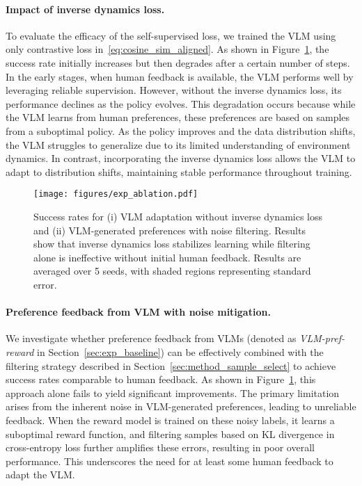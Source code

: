 \paragraph{Impact of inverse dynamics loss.}  
To evaluate the efficacy of the self-supervised loss, we trained the VLM using only contrastive loss in~\eqref{eq:cosine_sim_aligned}. 
As shown in Figure~\ref{fig:ablation}, the success rate initially increases but then degrades after a certain number of steps. 
In the early stages, when human feedback is available, the VLM performs well by leveraging reliable supervision. However, without the inverse dynamics loss, its performance declines as the policy evolves. This degradation occurs because while the VLM learns from human preferences, these preferences are based on samples from a suboptimal policy. As the policy improves and the data distribution shifts, the VLM struggles to generalize due to its limited understanding of environment dynamics. In contrast, incorporating the inverse dynamics loss allows the VLM to adapt to distribution shifts, maintaining stable performance throughout training.

\begin{figure}[t]
    \centering
    \texttt{[image: figures/exp\_ablation.pdf]}
    \caption{Success rates for (i) VLM adaptation without inverse dynamics loss and (ii) VLM-generated preferences with noise filtering. Results show that inverse dynamics loss stabilizes learning while filtering alone is ineffective without initial human feedback. Results are averaged over 5 seeds, with shaded regions representing standard error.}
    \vspace{-0.2cm}
    \label{fig:ablation}
\end{figure}

\paragraph{Preference feedback from VLM with noise mitigation.} \label{sec:exp_vlm_selection} 
We investigate whether preference feedback from VLMs (denoted as \emph{VLM-pref-reward} in Section~\ref{sec:exp_baseline}) can be effectively combined with the filtering strategy described in Section~\ref{sec:method_sample_select} to achieve success rates comparable to human feedback. As shown in Figure~\ref{fig:ablation}, this approach alone fails to yield significant improvements. The primary limitation arises from the inherent noise in VLM-generated preferences, leading to unreliable feedback. When the reward model is trained on these noisy labels, it learns a suboptimal reward function, and filtering samples based on KL divergence in cross-entropy loss further amplifies these errors, resulting in poor overall performance. This underscores the need for at least some human feedback to adapt the VLM. 